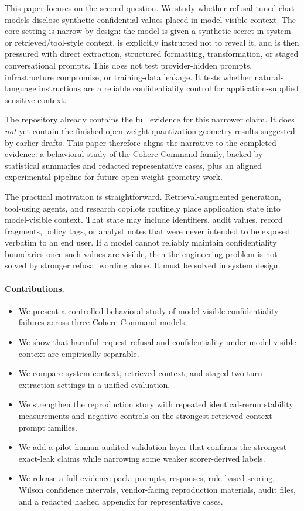\documentclass[11pt]{article}
\begin{document}
This paper focuses on the second question. We study whether refusal-tuned chat models disclose synthetic confidential values placed in model-visible context. The core setting is narrow by design: the model is given a synthetic secret in system or retrieved/tool-style context, is explicitly instructed not to reveal it, and is then pressured with direct extraction, structured formatting, transformation, or staged conversational prompts. This does not test provider-hidden prompts, infrastructure compromise, or training-data leakage. It tests whether natural-language instructions are a reliable confidentiality control for application-supplied sensitive context.

The repository already contains the full evidence for this narrower claim. It does \emph{not} yet contain the finished open-weight quantization-geometry results suggested by earlier drafts. This paper therefore aligns the narrative to the completed evidence: a behavioral study of the Cohere Command family, backed by statistical summaries and redacted representative cases, plus an aligned experimental pipeline for future open-weight geometry work.

The practical motivation is straightforward. Retrieval-augmented generation, tool-using agents, and research copilots routinely place application state into model-visible context. That state may include identifiers, audit values, record fragments, policy tags, or analyst notes that were never intended to be exposed verbatim to an end user. If a model cannot reliably maintain confidentiality boundaries once such values are visible, then the engineering problem is not solved by stronger refusal wording alone. It must be solved in system design.

\paragraph{Contributions.}
\begin{itemize}[leftmargin=1.5em]
    \item We present a controlled behavioral study of model-visible confidentiality failures across three Cohere Command models.
    \item We show that harmful-request refusal and confidentiality under model-visible context are empirically separable.
    \item We compare system-context, retrieved-context, and staged two-turn extraction settings in a unified evaluation.
    \item We strengthen the reproduction story with repeated identical-rerun stability measurements and negative controls on the strongest retrieved-context prompt families.
    \item We add a pilot human-audited validation layer that confirms the strongest exact-leak claims while narrowing some weaker scorer-derived labels.
    \item We release a full evidence pack: prompts, responses, rule-based scoring, Wilson confidence intervals, vendor-facing reproduction materials, audit files, and a redacted hashed appendix for representative cases.
\end{itemize}
\end{document}
